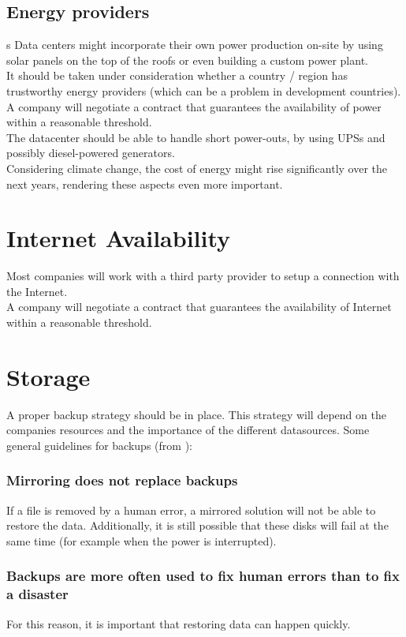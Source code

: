\documentclass[12pt]{report}
\begin{document}
\subsection{Energy providers}
\label{energy_provider}s
Data centers might incorporate their own power production on-site by
using solar panels on the top of the roofs or even building a custom
power plant.\\
It should be taken under consideration whether a country / region has
 trustworthy energy providers (which can be a problem in development 
countries).\\
A company will negotiate a contract that guarantees the availability of power
within a reasonable threshold.\\
The datacenter should be able to handle short power-outs, by using
UPSs and possibly diesel-powered generators.\\
Considering climate change, the cost of energy might rise
significantly over the next years, rendering these aspects even more important.

\section{Internet Availability}
Most companies will work with a third party provider to setup a
connection with the Internet. \\
A company will negotiate a contract that guarantees the availability of Internet
within a reasonable threshold.\\

\section{Storage}
A proper backup strategy should be in place. This strategy will depend
on the companies resources and the importance of the different
datasources.
Some general guidelines for backups (from \cite{ha_book}):
\subsubsection{Mirroring does not replace backups}
If a file
is removed by a human error, a mirrored solution will not be able to
restore the data.
Additionally, it is still possible that these disks will
fail at the same time
(for example when the power is interrupted).

\subsubsection{Backups are more often used to fix human errors
  than to fix a disaster}
For this reason, it is important that restoring data can happen
quickly.
\end{document}
